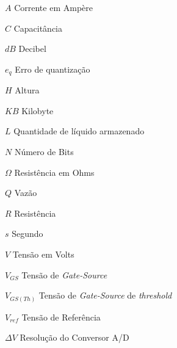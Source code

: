 \begin{simbolos}
  \item[$ A $] Corrente em Ampère
  \item[$ C $] Capacitância
  \item[$ dB $] Decibel
  \item[$ e_q $] Erro de quantização
  \item[$ H $] Altura
  \item[$ KB $] Kilobyte
  \item[$ L $] Quantidade de líquido armazenado
  \item[$ N $] Número de Bits
  \item[$ \Omega $] Resistência em Ohms
  \item[$ Q $] Vazão
  \item[$ R $] Resistência
  \item[$ s $] Segundo
  \item[$ V $] Tensão em Volts
  \item[$ V_{GS} $] Tensão de \textit{Gate-Source}
  \item[$ V_{GS(Th)} $] Tensão de \textit{Gate-Source} de \textit{threshold}
  \item[$ V_{ref} $] Tensão de Referência
  \item[$ \Delta V $] Resolução do Conversor A/D
\end{simbolos}
